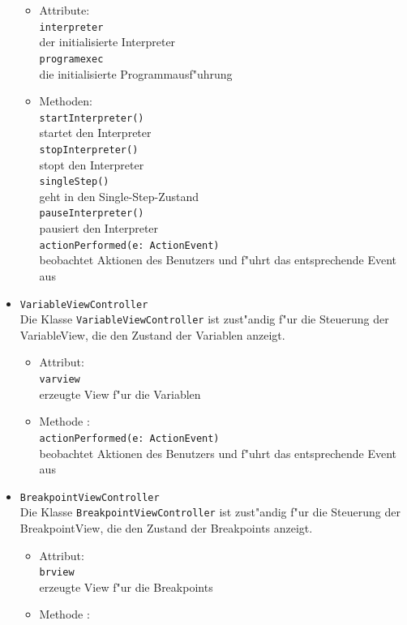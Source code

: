 \documentclass[10pt,a4paper,titlepage]{article}
\begin{document}
\begin{itemize}
\begin{itemize}
\item Attribute: \\
\texttt{interpreter} \\
der initialisierte Interpreter \\
\texttt{programexec} \\
die initialisierte Programmausf"uhrung 
\item Methoden: \\
\texttt{startInterpreter()} \\
startet den Interpreter \\
\texttt{stopInterpreter()} \\
stopt den Interpreter \\
\texttt{singleStep()} \\
geht in den Single-Step-Zustand \\
\texttt{pauseInterpreter()} \\
pausiert den Interpreter \\
\texttt{actionPerformed(e: ActionEvent)} \\
beobachtet Aktionen des Benutzers und f"uhrt das entsprechende Event aus
\end{itemize}
\item \texttt{VariableViewController} \\
Die Klasse \texttt{VariableViewController} ist zust"andig f"ur die Steuerung der VariableView, die den Zustand der Variablen anzeigt. 
\begin{itemize}
\item Attribut: \\
\texttt{varview} \\
erzeugte View f"ur die Variablen 
\item Methode :\\
\texttt{actionPerformed(e: ActionEvent)} \\
beobachtet Aktionen des Benutzers und f"uhrt das entsprechende Event aus
\end{itemize}
\item \texttt{BreakpointViewController} \\
Die Klasse \texttt{BreakpointViewController} ist zust"andig f"ur die Steuerung der BreakpointView, die den Zustand der Breakpoints anzeigt.
\begin{itemize}
\item Attribut: \\
\texttt{brview} \\
erzeugte View f"ur die Breakpoints
\item Methode :\\

\end{itemize}
\end{itemize}
\end{document}
